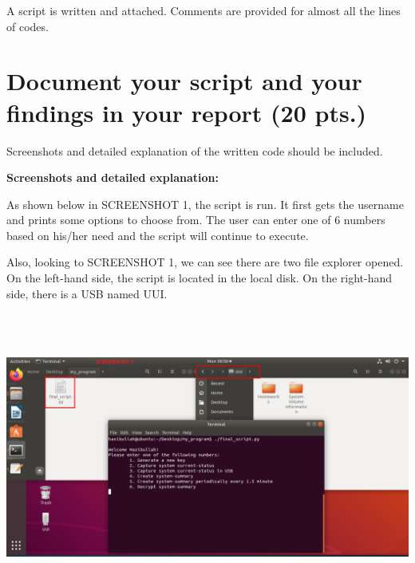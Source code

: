 \documentclass{article} %
\begin{document}
\noindent A script is written and attached.\newline
Comments are provided for almost all the lines of codes.\newline\newline\newline\newline\newline\newline\newline\newline
\noindent 


\section{ Document your script and your findings in your report (20 pts.) }

\noindent Screenshots and detailed explanation of the written code should be included.\newline

\noindent 
   
      
      


\noindent \textbf{Screenshots and detailed explanation:}

As shown below in SCREENSHOT 1, the script is run. It first gets the username and prints some options to choose from. The user can enter one of 6 numbers based on his/her need and the script will continue to execute.

\noindent Also, looking to SCREENSHOT 1, we can see there are two file explorer opened. On the left-hand side, the script is located in the local disk. On the right-hand side, there is a USB named UUI.

\noindent \includegraphics*[width=6in, height=3.76in, keepaspectratio=true]{1.png}
\end{document}
